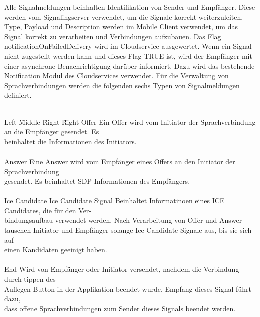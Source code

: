 Alle Signalmeldungen beinhalten Identifikation von Sender und Empfänger.
Diese werden vom Signalingserver verwendet, um die Signale korrekt weiterzuleiten.
Type, Payload und Description werden im Mobile Client verwendet, um das Signal korrekt zu verarbeiten und Verbindungen aufzubauen.
Das Flag notificationOnFailedDelivery wird im Cloudservice ausgewertet.
Wenn ein Signal nicht zugestellt werden kann und dieses Flag TRUE ist, wird der Empfänger mit einer asynchrone Benachrichtigung darüber informiert.
Dazu wird das bestehende Notification Modul des Cloudservices verwendet.
Für die Verwaltung von Sprachverbindungen werden die folgenden sechs Typen von Signalmeldungen definiert.
\\ \\
\begin{tabbing}
    Left \= Middle \= Right \= Right \kill
    Offer
    \> \> \> Ein Offer wird vom Initiator der Sprachverbindung an die Empfänger gesendet. Es
    \\\> \> \> beinhaltet die Informationen des Initiators. \\ \\

    Answer
    \> \> \> Eine Answer wird vom Empfänger eines Offers an den Initiator der Sprachverbindung
    \\\> \> \> gesendet. Es beinhaltet SDP Informationen des Empfängers. \\ \\

    Ice Candidate
    \> \> \> Ice Candidate Signal Beinhaltet Informatinoen eines ICE Candidates, die für den Ver-
    \\ \> \> \> bindungsaufbau verwendet werden. Nach Verarbeitung von Offer und Answer
    \\ \> \> \> tauschen Initiator und Empfänger solange Ice Candidate Signale aus, bis sie sich auf
    \\ \> \> \> einen Kandidaten geeinigt haben.\\ \\

    End
    \> \> \> Wird von Empfänger oder Initiator versendet, nachdem die Verbindung durch tippen des
    \\ \> \> \> Auflegen-Button in der Applikation beendet wurde. Empfang dieses Signal führt dazu,
    \\ \> \> \> dass offene Sprachverbindungen zum Sender dieses Signals beendet werden.\\ \\


\end{tabbing}
